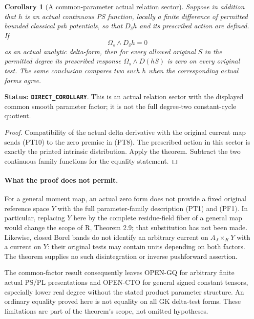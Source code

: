 \documentclass[11pt,a4paper]{article}
\numberwithin{equation}{section}
\newtheorem{corollary}[theorem]{Corollary}
\theoremstyle{definition}
\theoremstyle{remark}
\begin{document}
\begin{corollary}[A common-parameter actual relation sector]
\label{cor:r12-product-parameter-actual-relation}
Suppose in addition that $h$ is an actual continuous PS function,
locally a finite difference of permitted bounded classical psh
potentials, so that $D_\delta h$ and its prescribed action are
defined. If
\[
                             \Omega_s\wedge D_\delta h=0
 \tag{PT10}
\]
as an actual analytic delta-form, then for every allowed original
$S$ in the permitted degree its prescribed response
$\Omega_s\wedge D(hS)$ is zero on every original test.
The same conclusion compares two such $h$ when the corresponding
actual forms agree.
\end{corollary}

\noindent\textbf{Status: \texttt{DIRECT\_COROLLARY}}. This is an
actual relation sector with the displayed common smooth parameter
factor; it is not the full degree-two constant-cycle quotient.

\begin{proof}
Compatibility of the actual delta derivative with the original
current map sends (PT10) to the zero premise in (PT8). The
prescribed action in this sector is exactly the printed intrinsic
distribution. Apply the theorem. Subtract the two continuous
family functions for the equality statement.
\end{proof}

\paragraph{What the proof does not permit.}
For a general moment map, an actual zero form does not provide a
fixed original reference space $Y$ with the full parameter-family
description (PT1) and (PF1). In particular, replacing $Y$ here by
the complete residue-field fiber of a general map would change the
scope of R, Theorem 2.9; that substitution has not been made.
Likewise, closed Borel bands do not identify an arbitrary current
on $A_J\times_KY$ with a current on $Y$: their original tests may
contain units depending on both factors. The theorem supplies no
such disintegration or inverse pushforward assertion.

The common-factor result consequently leaves OPEN-GQ for arbitrary
finite actual PS/PL presentations and OPEN-CTO for general signed
constant tensors, especially lower real degree without the stated
product parameter structure. An ordinary equality proved here is
not equality on all GK delta-test forms. These limitations are
part of the theorem's scope, not omitted hypotheses.
\end{document}
